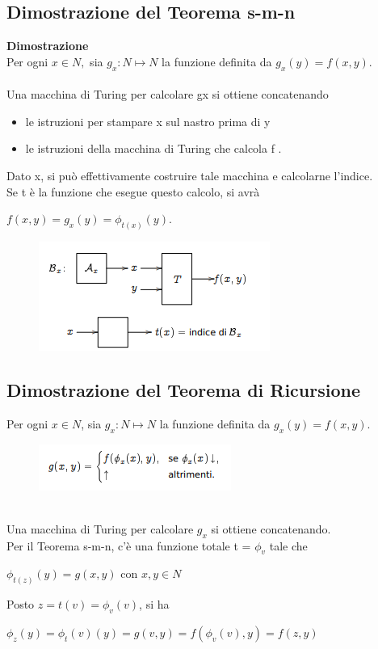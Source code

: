 \subsection{Dimostrazione del Teorema s-m-n}
\textbf{Dimostrazione}\\
Per ogni $x \in N,$ sia $g_x: N \mapsto N$ la funzione definita da $g_x(y) = f(x,y)$.\\\\
Una macchina di Turing per calcolare gx si ottiene concatenando
\begin{itemize}
    \item le istruzioni per stampare x sul nastro prima di y
    
    \item le istruzioni della macchina di Turing che calcola f .
\end{itemize}
Dato x, si può effettivamente costruire tale macchina e calcolarne l’indice.\\
Se t è la funzione che esegue questo calcolo, si avrà\\
\begin{center}
    $f(x,y)=g_x(y) = \phi_{t(x)}(y).$\\
\end{center}
\begin{figure}[htp]
    \centering
    \includegraphics[scale=0.8]{tesi_stile/img/cap6foto2.png}
\end{figure}
\newpage
\subsection{Dimostrazione del Teorema di Ricursione}
Per ogni $x \in N$, sia $g_x : N \mapsto N$ la funzione definita da $g_x(y) = f(x,y)$.
\begin{figure}[htp]
    \centering
    \includegraphics[scale=0.9]{tesi_stile/img/cap6f3.png}
\end{figure}
\\Una macchina di Turing per calcolare $g_x$ si ottiene concatenando.\\
Per il Teorema s-m-n, c’è una funzione totale t = $\phi_v$ tale che\\
\begin{center}
    $\phi_{t(z)}(y) = g(x,y)$ con $x,y \in N$
\end{center}
Posto $z = t(v) = \phi_v (v)$, si ha
\begin{center}
   $ \phi_z(y) = \phi_t{(v)}(y) = g(v,y)=f(\phi_v(v), y) = f (z,y)$
\end{center}
\newpage
